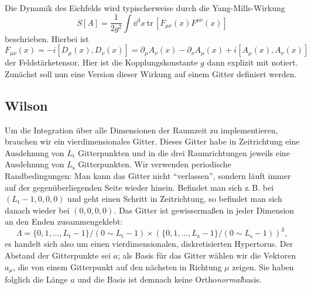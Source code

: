 Die Dynamik des Eichfelds wird typischerweise durch die Yang-Mills-Wirkung
\begin{equation} \label{eq:yang-millsAction}
S[A] = \frac{1}{2 g^2} \int \dd^4{x} \, \mathrm{tr}\,
\left[ F_{\mu \nu}(x) F^{\mu \nu}(x) \right]
\end{equation}
beschrieben. \cite{gattringerLang} Hierbei ist
\[
F_{\mu \nu}(x) = -i [D_\mu(x), D_\nu(x)]
= \partial_\mu A_\nu(x) - \partial_\nu A_\mu(x) + i [A_\mu(x), A_\nu(x)]
\]
der Feldstärketensor. Hier ist die Kopplungskonstante $g$ dann explizit mit
notiert. Zunächst soll nun eine Version dieser Wirkung auf einem Gitter definiert
werden.

\subsection{Wilson}
Um die Integration über alle Dimensionen der Raumzeit zu implementieren,
brauchen wir ein vierdimensionales Gitter. Dieses Gitter habe in Zeitrichtung
eine Ausdehnung von $L_\mathrm{t}$ Gitterpunkten und in die drei Raumrichtungen
jeweils eine Ausdehnung von $L_\mathrm{s}$ Gitterpunkten. Wir verwenden
periodische Randbedingungen: Man kann das Gitter nicht \enquote{verlassen},
sondern läuft immer auf der gegenüberliegenden Seite wieder hinein. Befindet
man sich z.\,B. bei $(L_\mathrm{t}-1,0,0,0)$ und geht einen Schritt in
Zeitrichtung, so befindet man sich danach wieder bei $(0,0,0,0)$. Das Gitter
ist gewissermaßen in jeder Dimension an den Enden zusammengeklebt:
\[
\Lambda = \{0, 1, \dots, L_\mathrm{t}-1\}/(0 \sim L_\mathrm{t}-1)
\times \left( \{0, 1, \dots, L_\mathrm{s}-1 \} / (0 \sim L_\mathrm{s}-1) \right)^3,
\]
es handelt sich also um einen vierdimensionalen, diskretisierten Hypertorus.
Der Abstand der Gitterpunkte sei $a$; als Basis für das Gitter wählen wir die
Vektoren $a_\mu$, die von einem Gitterpunkt auf den nächsten in Richtung $\mu$
zeigen. Sie haben folglich die Länge $a$ und die Basis ist demnach keine
Ortho\emph{normal}basis.

